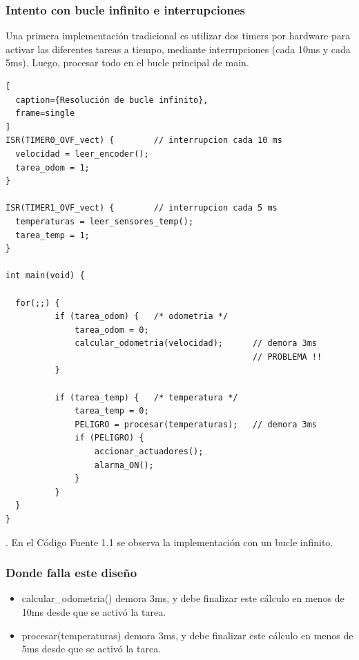 \documentclass[output=paper, 
colorlinks,
citecolor=brown,
newtxmath
]{langscibook}
\begin{document}
\subsubsection{Intento con bucle infinito e interrupciones}

Una primera implementación tradicional es utilizar dos timers por hardware para activar las diferentes tareas a tiempo, mediante interrupciones (cada 10ms y cada 5ms). Luego, procesar todo en el bucle principal de main.


\FloatBarrier
\begin{codefloat}[tp]
\begin{lstlisting}[
  caption={Resolución de bucle infinito},
  frame=single
]
ISR(TIMER0_OVF_vect) {        // interrupcion cada 10 ms
  velocidad = leer_encoder();
  tarea_odom = 1;
}

ISR(TIMER1_OVF_vect) {        // interrupcion cada 5 ms
  temperaturas = leer_sensores_temp();
  tarea_temp = 1;
}

int main(void) {

  for(;;) {
          if (tarea_odom) {	  /* odometria */
              tarea_odom = 0; 		
              calcular_odometria(velocidad);      // demora 3ms
                                                  // PROBLEMA !!
          }

          if (tarea_temp) {	  /* temperatura */
              tarea_temp = 0;
              PELIGRO = procesar(temperaturas);   // demora 3ms
              if (PELIGRO) {
                  accionar_actuadores();
                  alarma_ON();	
              }
          }
  }
}
\end{lstlisting}
\end{codefloat}

.
En el Código Fuente 1.1 se observa la implementación con un bucle infinito.


\subsubsection*{Donde falla este diseño}

\begin{itemize}
	\item calcular\_odometria() demora 3ms, y debe finalizar este cálculo en menos de 10ms desde que se activó la tarea. 
	\item procesar(temperaturas) demora 3ms, y debe finalizar este cálculo en menos de 5ms desde que se activó la tarea. 

\end{itemize}
\end{document}
